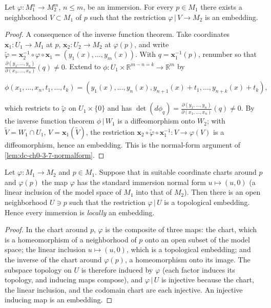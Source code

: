 \begin{proposition}
  \label{prop:dc-ch0-3-7}
  \leanok
  Let $\varphi:M_1^n\to M_2^m$, $n\le m$, be an immersion. For every $p\in M_1$
  there exists a neighborhood $V\subset M_1$ of $p$ such that the restriction
  $\varphi\,|\,V\to M_2$ is an embedding.
\end{proposition}
\begin{proof}
  \sketch
  \leanok
  A consequence of the inverse function theorem. Take coordinates
  $\mathbf{x}_1:U_1\to M_1$ at $p$, $\mathbf{x}_2:U_2\to M_2$ at $\varphi(p)$, and
  write $\tilde\varphi=\mathbf{x}_2^{-1}\circ\varphi\circ\mathbf{x}_1=(y_1(x),\dots,y_m(x))$.
  With $q=\mathbf{x}_1^{-1}(p)$, renumber so that
  $\frac{\partial(y_1,\dots,y_n)}{\partial(x_1,\dots,x_n)}(q)\neq0$. Extend to
  $\phi:U_1\times\mathbb{R}^{m-n=k}\to\mathbb{R}^m$ by
  
  $$
  \phi(x_1,\dots,x_n,t_1,\dots,t_k)=(y_1(x),\dots,y_n(x),y_{n+1}(x)+t_1,\dots,y_{n+k}(x)+t_k),
  $$
  
  which restricts to $\tilde\varphi$ on $U_1\times\{0\}$ and has
  $\det(d\phi_q)=\frac{\partial(y_1,\dots,y_n)}{\partial(x_1,\dots,x_n)}(q)\neq0$. By
  the inverse function theorem $\phi\,|\,W_1$ is a diffeomorphism onto $W_2$; with
  $\tilde V=W_1\cap U_1$, $V=\mathbf{x}_1(\tilde V)$, the restriction
  $\mathbf{x}_2\circ\tilde\varphi\circ\mathbf{x}_1^{-1}:V\to\varphi(V)$ is a
  diffeomorphism, hence an embedding. This is the normal-form argument of
  \cref{lem:dc-ch0-3-7-normalform}.

\end{proof}

\begin{lemma}
  \label{lem:dc-ch0-3-7-embedding}
  \leanok
  Let $\varphi:M_1\to M_2$ and $p\in M_1$. Suppose that in suitable coordinate charts
  around $p$ and $\varphi(p)$ the map $\varphi$ has the standard immersion normal form
  $u\mapsto(u,0)$ (a linear inclusion of the model space of $M_1$ into that of $M_2$).
  Then there is an open neighborhood $U\ni p$ such that the restriction $\varphi\,|\,U$ is
  a topological embedding. Hence every immersion is \emph{locally} an embedding.
\end{lemma}
\begin{proof}
  \sketch
  \leanok
  In the chart around $p$, $\varphi$ is the composite of three maps: the chart, which is a
  homeomorphism of a neighborhood of $p$ onto an open subset of the model space; the linear
  inclusion $u\mapsto(u,0)$, which is a topological embedding; and the inverse of the chart
  around $\varphi(p)$, a homeomorphism onto its image. The subspace topology on $U$ is
  therefore induced by $\varphi$ (each factor induces its topology, and inducing maps
  compose), and $\varphi\,|\,U$ is injective because the chart, the linear inclusion, and
  the codomain chart are each injective. An injective inducing map is an embedding.
\end{proof}

